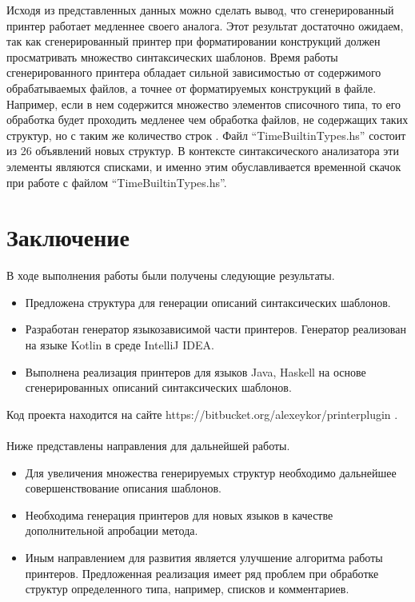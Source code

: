 \documentclass{matmex-diploma}
\begin{document}
Исходя из представленных данных можно сделать вывод, что сгенерированный принтер работает медленнее своего аналога. Этот результат достаточно ожидаем, так как сгенерированный принтер при форматировании конструкций должен просматривать множество синтаксических шаблонов. Время работы сгенерированного принтера обладает сильной зависимостью от содержимого обрабатываемых файлов, а точнее от форматируемых конструкций в файле. Например, если в нем содержится множество элементов списочного типа, то его обработка будет проходить медленее чем обработка файлов, не содержащих таких структур, но с таким же количество строк \cite{podkopaev:diploma}. Файл “TimeBuiltinTypes.hs” состоит из 26 объявлений новых структур. В контексте синтаксического анализатора эти элементы являются списками, и именно этим обуславливается временной скачок при работе с файлом “TimeBuiltinTypes.hs”.

\section*{Заключение}
В ходе выполнения работы были получены следующие результаты.
\begin{itemize}
\item Предложена структура для генерации описаний синтаксических шаблонов.
\item Разработан генератор языкозависимой части принтеров. Генератор реализован на языке Kotlin в среде IntelliJ IDEA.
\item Выполнена реализация принтеров для языков Java, Haskell на основе сгенерированных описаний синтаксических шаблонов.
\end{itemize}

Код проекта находится на сайте https://bitbucket.org/alexeykor/printerplugin .
\\
\\
Ниже представлены направления для дальнейшей работы.
\begin{itemize}
\item Для увеличения множества генерируемых структур необходимо дальнейшее совершенствование описания шаблонов.
\item Необходима генерация принтеров для новых языков в качестве дополнительной апробации метода.
\item Иным направлением для развития является улучшение алгоритма работы принтеров. Предложенная реализация имеет ряд проблем при обработке структур определенного типа, например, списков и комментариев.
\end{itemize}



\end{document}
